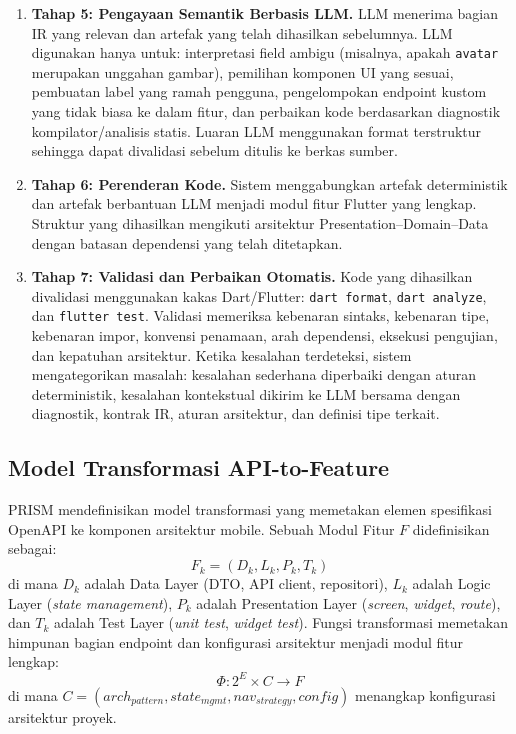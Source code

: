 \begin{enumerate}
    \item \textbf{Tahap 5: Pengayaan Semantik Berbasis LLM.} LLM menerima bagian IR yang relevan dan artefak yang telah dihasilkan sebelumnya. LLM digunakan hanya untuk: interpretasi field ambigu (misalnya, apakah \texttt{avatar} merupakan unggahan gambar), pemilihan komponen UI yang sesuai, pembuatan label yang ramah pengguna, pengelompokan endpoint kustom yang tidak biasa ke dalam fitur, dan perbaikan kode berdasarkan diagnostik kompilator/analisis statis. Luaran LLM menggunakan format terstruktur sehingga dapat divalidasi sebelum ditulis ke berkas sumber.
    
    \item \textbf{Tahap 6: Perenderan Kode.} Sistem menggabungkan artefak deterministik dan artefak berbantuan LLM menjadi modul fitur Flutter yang lengkap. Struktur yang dihasilkan mengikuti arsitektur Presentation--Domain--Data dengan batasan dependensi yang telah ditetapkan.
    
    \item \textbf{Tahap 7: Validasi dan Perbaikan Otomatis.} Kode yang dihasilkan divalidasi menggunakan kakas Dart/Flutter: \texttt{dart format}, \texttt{dart analyze}, dan \texttt{flutter test}. Validasi memeriksa kebenaran sintaks, kebenaran tipe, kebenaran impor, konvensi penamaan, arah dependensi, eksekusi pengujian, dan kepatuhan arsitektur. Ketika kesalahan terdeteksi, sistem mengategorikan masalah: kesalahan sederhana diperbaiki dengan aturan deterministik, kesalahan kontekstual dikirim ke LLM bersama dengan diagnostik, kontrak IR, aturan arsitektur, dan definisi tipe terkait.
\end{enumerate}

\subsection{Model Transformasi API-to-Feature}

PRISM mendefinisikan model transformasi yang memetakan elemen spesifikasi OpenAPI ke komponen arsitektur mobile. Sebuah Modul Fitur $F$ didefinisikan sebagai:
\begin{equation}
    F_k = (D_k, L_k, P_k, T_k)
\end{equation}
di mana $D_k$ adalah Data Layer (DTO, API client, repositori), $L_k$ adalah Logic Layer (\textit{state management}), $P_k$ adalah Presentation Layer (\textit{screen}, \textit{widget}, \textit{route}), dan $T_k$ adalah Test Layer (\textit{unit test}, \textit{widget test}). Fungsi transformasi memetakan himpunan bagian endpoint dan konfigurasi arsitektur menjadi modul fitur lengkap:
\begin{equation}
    \Phi : 2^{E} \times C \rightarrow F
\end{equation}
di mana $C = (arch_{pattern}, state_{mgmt}, nav_{strategy}, config)$ menangkap konfigurasi arsitektur proyek.

